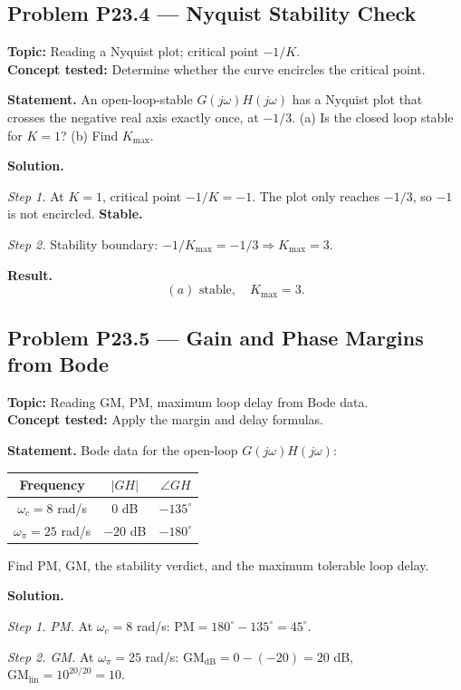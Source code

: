 \documentclass[11pt]{article}
\begin{document}
\subsection{Problem P23.4 --- Nyquist Stability Check}
\textbf{Topic:} Reading a Nyquist plot; critical point $-1/K$.\\
\textbf{Concept tested:} Determine whether the curve encircles the critical point.

\textbf{Statement.} An open-loop-stable $G(j\omega)H(j\omega)$ has a Nyquist
plot that crosses the negative real axis exactly once, at $-1/3$.
(a) Is the closed loop stable for $K=1$? (b) Find $K_{\max}$.

\textbf{Solution.}

\textit{Step 1.} At $K=1$, critical point $-1/K=-1$. The plot only reaches
$-1/3$, so $-1$ is not encircled. \textbf{Stable.}

\textit{Step 2.} Stability boundary: $-1/K_{\max} = -1/3\Rightarrow K_{\max}=3$.

\textbf{Result.}
\[
\boxed{\,(a)\text{ stable},\quad K_{\max} = 3.\,}
\]

\subsection{Problem P23.5 --- Gain and Phase Margins from Bode}
\textbf{Topic:} Reading GM, PM, maximum loop delay from Bode data.\\
\textbf{Concept tested:} Apply the margin and delay formulas.

\textbf{Statement.} Bode data for the open-loop $G(j\omega)H(j\omega)$:

\begin{center}
\begin{tabular}{c|c|c}
Frequency & $|GH|$ & $\angle GH$\\\hline
$\omega_{c}=8$ rad/s & $0$ dB & $-135^{\circ}$\\
$\omega_{\pi}=25$ rad/s & $-20$ dB & $-180^{\circ}$\\
\end{tabular}
\end{center}

Find PM, GM, the stability verdict, and the maximum tolerable loop delay.

\textbf{Solution.}

\textit{Step 1. PM.} At $\omega_{c}=8$ rad/s:
$\text{PM} = 180^{\circ}-135^{\circ} = 45^{\circ}$.

\textit{Step 2. GM.} At $\omega_{\pi}=25$ rad/s:
$\text{GM}_{\text{dB}} = 0-(-20) = 20$ dB,
$\text{GM}_{\text{lin}} = 10^{20/20}=10$.
\end{document}
